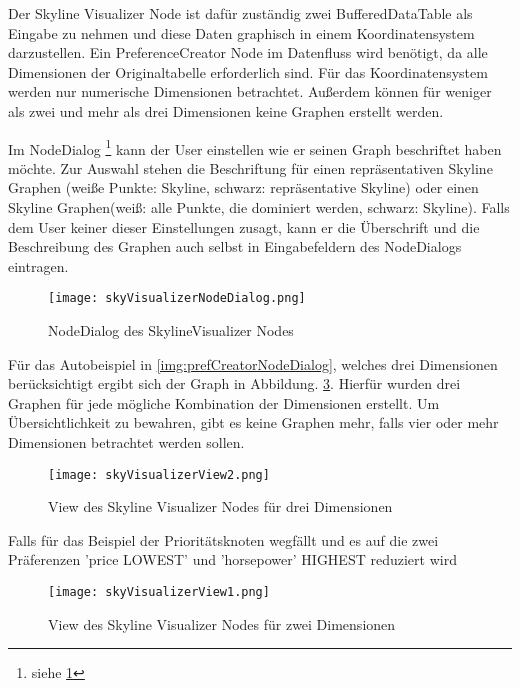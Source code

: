 Der Skyline Visualizer Node ist dafür zuständig zwei BufferedDataTable als Eingabe zu nehmen und diese Daten graphisch in einem Koordinatensystem darzustellen. Ein PreferenceCreator Node im Datenfluss wird benötigt, da alle Dimensionen der Originaltabelle erforderlich sind. Für das Koordinatensystem werden nur numerische Dimensionen betrachtet. Außerdem können für weniger als zwei und mehr als drei Dimensionen keine Graphen erstellt werden.

Im NodeDialog \footnote{siehe \ref{img:skyVisualizerNodeDialog}} kann der User einstellen wie er seinen Graph beschriftet haben möchte. Zur Auswahl stehen die Beschriftung für einen repräsentativen Skyline Graphen (weiße Punkte: Skyline, schwarz: repräsentative Skyline) oder einen Skyline Graphen(weiß: alle Punkte, die dominiert werden, schwarz: Skyline). Falls dem User keiner dieser Einstellungen zusagt, kann er die Überschrift und die Beschreibung des Graphen auch selbst in Eingabefeldern des NodeDialogs eintragen.

\begin{figure}[H]
	\centering
	\texttt{[image: skyVisualizerNodeDialog.png]}
	\caption{NodeDialog des SkylineVisualizer Nodes}
	\label{img:skyVisualizerNodeDialog}
\end{figure}

Für das Autobeispiel in \ref{img:prefCreatorNodeDialog}, welches drei Dimensionen berücksichtigt ergibt sich der Graph in Abbildung. \ref{img:skyVisiualizerView1}. Hierfür wurden drei Graphen für jede mögliche Kombination der Dimensionen erstellt. Um Übersichtlichkeit zu bewahren, gibt es keine Graphen mehr, falls vier oder mehr Dimensionen betrachtet werden sollen.

\begin{figure}[H]
	\centering
	\texttt{[image: skyVisualizerView2.png]}
	\caption{View des Skyline Visualizer Nodes für drei Dimensionen}
	\label{img:skyVisiualizerView2}
\end{figure}

Falls für das Beispiel der Prioritätsknoten wegfällt und es auf die zwei Präferenzen 'price LOWEST' und 'horsepower' HIGHEST reduziert wird

\begin{figure}[H]
	\centering
	\texttt{[image: skyVisualizerView1.png]}
	\caption{View des Skyline Visualizer Nodes für zwei Dimensionen}
	\label{img:skyVisiualizerView1}
\end{figure}
